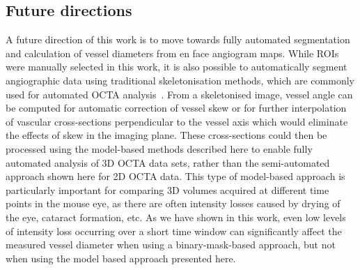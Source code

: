 \documentclass{optica-article}
\begin{document}
\subsection{Future directions}
\label{subsec:future_direction}
A future direction of this work is to move towards fully automated segmentation and calculation of vessel diameters from en face angiogram maps. While ROIs were manually selected in this work, it is also possible to automatically segment angiographic data using traditional skeletonisation methods, which are commonly used for automated OCTA analysis~\cite{chuQuantitativeAssessmentRetinal2016,untrachtTowardsStandardisingRetinal2024,weiAutomaticVesselDiameter2020}. From a skeletonised image, vessel angle can be computed for automatic correction of vessel skew or for further interpolation of vascular cross-sections perpendicular to the vessel axis which would eliminate the effects of skew in the imaging plane. These cross-sections could then be processed using the model-based methods described here to enable fully automated analysis of 3D OCTA data sets, rather than the semi-automated approach shown here for 2D OCTA data. This type of model-based approach is particularly important for comparing 3D volumes acquired at different time points in the mouse eye, as there are often intensity losses caused by drying of the eye, cataract formation, etc. As we have shown in this work, even low levels of intensity loss occurring over a short time window can significantly affect the measured vessel diameter when using a binary-mask-based approach, but not when using the model based approach presented here.
\end{document}
